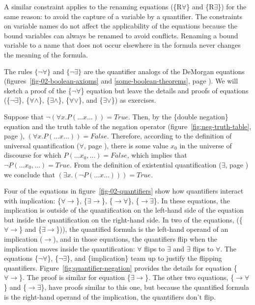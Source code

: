 {{A similar constraint applies to the renaming
equations (\{R$\forall$\} and \{R$\exists$\})
for the same reason: to avoid the
capture of a variable by a quantifier.
The constraints on variable names do not affect the applicability of
the equations because the bound variables can
always be renamed to avoid conflicts.
Renaming a bound variable to a name that does
not occur elsewhere in the formula never changes
the meaning of the formula.

\label{why-neg-forall}The
rules $\{\neg\forall\}$ and $\{\neg\exists\}$
are the quantifier analogs of the DeMorgan equations
(figures~\ref{fig-02-boolean-axioms} and \ref{some-boolean-theorems}, page \pageref{some-boolean-theorems}).
We will sketch a proof of the \{$\neg\forall$\} equation
but leave the details and proofs of equations
(\{$\neg\exists$\}, \{$\forall\wedge$\},
\{$\exists\wedge$\}, \{$\forall\vee$\}, and \{$\exists\vee$\}) as exercises.

Suppose that $\neg(\forall x.P(\dots x \dots)) = True$.
Then, by the \{double negation\} equation and the truth table of the negation operator
(figure~\ref{fig:neg-truth-table}, page \pageref{fig:neg-truth-table}),
$(\forall x.P(\dots x \dots)) = False$.
Therefore, according to the definition of universal quantification
($\forall$, page \pageref{def:universal-quantifier}),
there is some value $x_0$ in the universe of discourse for which
$P(\dots x_0, \dots)=False$, which implies that
$\neg P(\dots x_0, \dots)=True$.
From the definition of existential quantification
($\exists$, page \pageref{def:existential-quantifier})
we conclude that $(\exists x.(\neg P(\dots x \dots))) = True$.

Four of the equations in figure~\ref{fig-02-quantifiers}
show how quantifiers interact with implication:
\{${\forall}{\rightarrow}$\},
\{${\exists}{\rightarrow}$\},
\{${\rightarrow}{\forall}$\},
\{${\rightarrow}{\exists}$\}.
In these equations, the implication is outside of the quantification
on the left-hand side of the equation but inside the quantification
on the right-hand side.
In two of the equations, (\{${\forall}{\rightarrow}$\} and \{${\exists}{\rightarrow}$\})),
the quantified formula is the left-hand operand of an implication ($\rightarrow$),
and in those equations, the quantifiers flip when the implication moves inside
the quantification: $\forall$ flips to $\exists$ and $\exists$ flips to $\forall$.
The equations \{$\neg\forall$\}, \{$\neg\exists$\}, and \{implication\}
team up to justify the flipping quantifiers.
Figure~\ref{fig:quantifier-negation} provides the details for
equation \{${\forall}{\rightarrow}$\}.
The proof is similar for equation \{${\exists}{\rightarrow}$\}.
The other two equations, \{${\rightarrow}{\forall}$\} and \{${\rightarrow}{\exists}$\},
have proofs similar to this one, but because the quantified
formula is the right-hand operand of the implication,
the quantifiers don't flip.

}}
